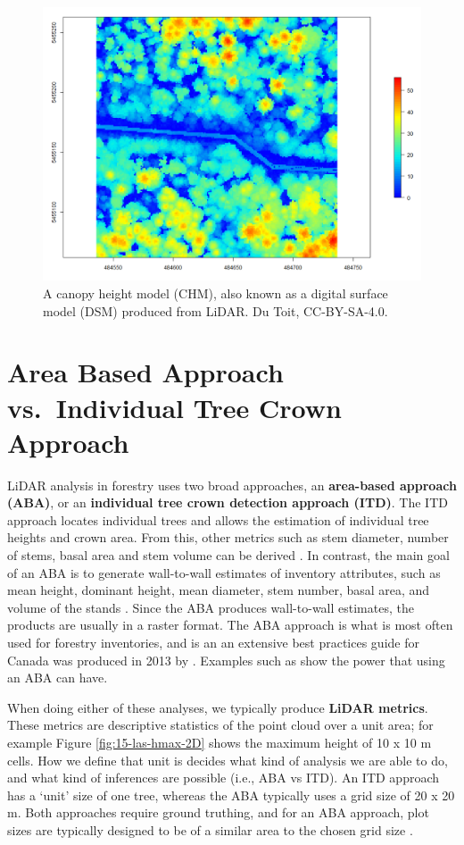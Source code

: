 \documentclass[
]{book}
\begin{document}
\begin{figure}
\includegraphics[width=0.7\linewidth]{images/15-las-CHM-2D} \caption{A canopy height model (CHM), also known as a digital surface model (DSM) produced from LiDAR. Du Toit, CC-BY-SA-4.0.}\label{fig:15-las-CHM-2D}
\end{figure}

\section{Area Based Approach vs.~Individual Tree Crown Approach}\label{area-based-approach-vs.-individual-tree-crown-approach}

LiDAR analysis in forestry uses two broad approaches, an \textbf{area-based approach (ABA)}, or an \textbf{individual tree crown detection approach (ITD)}. The ITD approach locates individual trees and allows the estimation of individual tree heights and crown area. From this, other metrics such as stem diameter, number of stems, basal area and stem volume can be derived \citep{hyyppa_detecting_1999}. In contrast, the main goal of an ABA is to generate wall-to-wall estimates of inventory attributes, such as mean height, dominant height, mean diameter, stem number, basal area, and volume of the stands \citep{naesset_predicting_2002}. Since the ABA produces wall-to-wall estimates, the products are usually in a raster format. The ABA approach is what is most often used for forestry inventories, and is an an extensive best practices guide for Canada was produced in 2013 by \citet{white_best_2013}. Examples such as \citet{tompalski_demonstrating_2019} show the power that using an ABA can have.

When doing either of these analyses, we typically produce \textbf{LiDAR metrics}. These metrics are descriptive statistics of the point cloud over a unit area; for example Figure \ref{fig:15-las-hmax-2D} shows the maximum height of 10 x 10 m cells. How we define that unit is decides what kind of analysis we are able to do, and what kind of inferences are possible (i.e., ABA vs ITD). An ITD approach has a `unit' size of one tree, whereas the ABA typically uses a grid size of 20 x 20 m. Both approaches require ground truthing, and for an ABA approach, plot sizes are typically designed to be of a similar area to the chosen grid size \citep{white_best_2013}.
\end{document}
